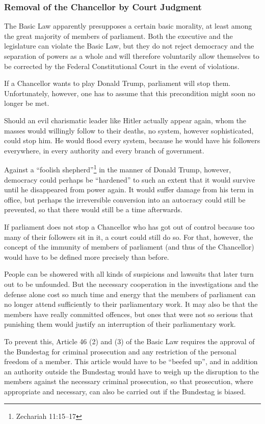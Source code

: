 \subsubsection{Removal of the Chancellor by Court Judgment}\label{subsubsec:removal_by_court}

The Basic Law apparently presupposes a certain basic morality, at least among the great majority of members of parliament.
Both the executive and the legislature can violate the Basic Law, but they do not reject democracy and the separation of powers as a whole and will therefore voluntarily allow themselves to be corrected by the Federal Constitutional Court in the event of violations.

If a Chancellor wants to play Donald Trump, parliament will stop them.
Unfortunately, however, one has to assume that this precondition might soon no longer be met.

Should an evil charismatic leader like Hitler actually appear again, whom the masses would willingly follow to their deaths, no system, however sophisticated, could stop him.
He would flood every system, because he would have his followers everywhere, in every authority and every branch of government.

Against a \enquote{foolish shepherd}\footnote{Zechariah 11:15--17} in the manner of Donald Trump, however, democracy could perhaps be \enquote{hardened} to such an extent that it would survive until he disappeared from power again.
It would suffer damage from his term in office, but perhaps the irreversible conversion into an autocracy could still be prevented, so that there would still be a time afterwards.

If parliament does not stop a Chancellor who has got out of control because too many of their followers sit in it, a court could still do so.
For that, however, the concept of the immunity of members of parliament (and thus of the Chancellor) would have to be defined more precisely than before.

People can be showered with all kinds of suspicions and lawsuits that later turn out to be unfounded.
But the necessary cooperation in the investigations and the defense alone cost so much time and energy that the members of parliament can no longer attend sufficiently to their parliamentary work.
It may also be that the members have really committed offences, but ones that were not so serious that punishing them would justify an interruption of their parliamentary work.

To prevent this, Article 46 (2) and (3) of the Basic Law requires the approval of the Bundestag for criminal prosecution and any restriction of the personal freedom of a member.
This article would have to be \enquote{beefed up}, and in addition an authority outside the Bundestag would have to weigh up the disruption to the members against the necessary criminal prosecution,
so that prosecution, where appropriate and necessary, can also be carried out if the Bundestag is biased.

